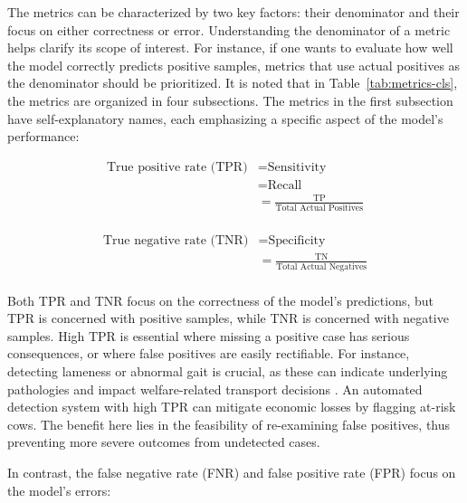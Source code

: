 The metrics can be characterized by two key factors: their denominator and their focus on either correctness or error. Understanding the denominator of a metric helps clarify its scope of interest. For instance, if one wants to evaluate how well the model correctly predicts positive samples, metrics that use actual positives as the denominator should be prioritized.
It is noted that in Table~\ref{tab:metrics-cls}, the metrics are organized in four subsections. The metrics in the first subsection have self-explanatory names, each emphasizing a specific aspect of the model’s performance:


\begin{equation} \label{eq_TPR}
    \begin{split}
    \text{True positive rate (TPR)} &= \text{Sensitivity}\\
                    &= \text{Recall}\\
                    &= \frac{\text{TP}}{\text{Total Actual Positives}}\\
    \end{split}
\end{equation}

\begin{equation} \label{eq_TNR}
    \begin{split}
    \text{True negative rate (TNR)} &= \text{Specificity}\\
                    &= \frac{\text{TN}}{\text{Total Actual Negatives}}\\
    \end{split}
\end{equation}

Both TPR and TNR focus on the correctness of the model's predictions, but TPR is concerned with positive samples, while TNR is concerned with negative samples. High TPR is essential where missing a positive case has serious consequences, or where false positives are easily rectifiable. For instance, detecting lameness or abnormal gait is crucial, as these can indicate underlying pathologies \citep{oleary_invited_2020} and impact welfare-related transport decisions \citep{stojkov_hot_2018}. An automated detection system \citep{oleary_invited_2020, alsaaod_automatic_2019,kang_accurate_2020} with high TPR can mitigate economic losses by flagging at-risk cows. The benefit here lies in the feasibility of re-examining false positives, thus preventing more severe outcomes from undetected cases. 


In contrast, the false negative rate (FNR) and false positive rate (FPR) focus on the model's errors:

